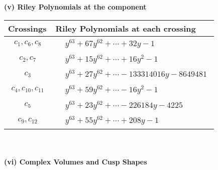 \documentclass[1p]{elsarticle_modified}
\theoremstyle{definition}
\begin{document}
\newpage\renewcommand{\arraystretch}{1}
\flushleft \textbf{(v) Riley Polynomials at the component}\newline \\
\begin{tabular}{m{50pt}|m{274pt}}
Crossings & \hspace{64pt}Riley Polynomials at each crossing \\
\hline $$\begin{aligned}c_{1},c_{6},c_{8}\end{aligned}$$&$\begin{aligned}
&y^{63}+67 y^{62}+\cdots+32 y-1
\end{aligned}$\\
\hline $$\begin{aligned}c_{2},c_{7}\end{aligned}$$&$\begin{aligned}
&y^{63}+15 y^{62}+\cdots+16 y^2-1
\end{aligned}$\\
\hline $$\begin{aligned}c_{3}\end{aligned}$$&$\begin{aligned}
&y^{63}+27 y^{62}+\cdots-133314016 y-8649481
\end{aligned}$\\
\hline $$\begin{aligned}c_{4},c_{10},c_{11}\end{aligned}$$&$\begin{aligned}
&y^{63}+59 y^{62}+\cdots-16 y^2-1
\end{aligned}$\\
\hline $$\begin{aligned}c_{5}\end{aligned}$$&$\begin{aligned}
&y^{63}+23 y^{62}+\cdots-226184 y-4225
\end{aligned}$\\
\hline $$\begin{aligned}c_{9},c_{12}\end{aligned}$$&$\begin{aligned}
&y^{63}+55 y^{62}+\cdots+208 y-1
\end{aligned}$\\
\hline
\end{tabular}\\~\\
\newpage\flushleft \textbf{(vi) Complex Volumes and Cusp Shapes}
\end{document}
